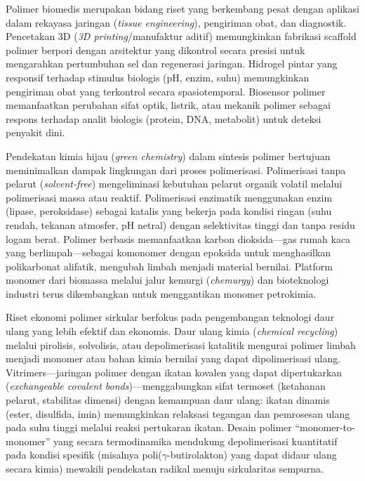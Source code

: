 \documentclass[12pt,a4paper,openany]{book}
\begin{document}
Polimer biomedis merupakan bidang riset yang berkembang pesat dengan aplikasi dalam rekayasa jaringan (\textit{tissue engineering}), pengiriman obat, dan diagnostik. Pencetakan 3D (\textit{3D printing}/manufaktur aditif) memungkinkan fabrikasi scaffold polimer berpori dengan arsitektur yang dikontrol secara presisi untuk mengarahkan pertumbuhan sel dan regenerasi jaringan. Hidrogel pintar yang responsif terhadap stimulus biologis (pH, enzim, suhu) memungkinkan pengiriman obat yang terkontrol secara spasiotemporal. Biosensor polimer memanfaatkan perubahan sifat optik, listrik, atau mekanik polimer sebagai respons terhadap analit biologis (protein, DNA, metabolit) untuk deteksi penyakit dini.

Pendekatan kimia hijau (\textit{green chemistry}) dalam sintesis polimer bertujuan meminimalkan dampak lingkungan dari proses polimerisasi. Polimerisasi tanpa pelarut (\textit{solvent-free}) mengeliminasi kebutuhan pelarut organik volatil melalui polimerisasi massa atau reaktif. Polimerisasi enzimatik menggunakan enzim (lipase, peroksidase) sebagai katalis yang bekerja pada kondisi ringan (suhu rendah, tekanan atmosfer, pH netral) dengan selektivitas tinggi dan tanpa residu logam berat. Polimer berbasis  memanfaatkan karbon dioksida---gas rumah kaca yang berlimpah---sebagai komonomer dengan epoksida untuk menghasilkan polikarbonat alifatik, mengubah limbah menjadi material bernilai. Platform monomer dari biomassa melalui jalur kemurgi (\textit{chemurgy}) dan bioteknologi industri terus dikembangkan untuk menggantikan monomer petrokimia.

Riset ekonomi polimer sirkular berfokus pada pengembangan teknologi daur ulang yang lebih efektif dan ekonomis. Daur ulang kimia (\textit{chemical recycling}) melalui pirolisis, solvolisis, atau depolimerisasi katalitik mengurai polimer limbah menjadi monomer atau bahan kimia bernilai yang dapat dipolimerisasi ulang. Vitrimers---jaringan polimer dengan ikatan kovalen yang dapat dipertukarkan (\textit{exchangeable covalent bonds})---menggabungkan sifat termoset (ketahanan pelarut, stabilitas dimensi) dengan kemampuan daur ulang: ikatan dinamis (ester, disulfida, imin) memungkinkan relaksasi tegangan dan pemrosesan ulang pada suhu tinggi melalui reaksi pertukaran ikatan. Desain polimer ``monomer-to-monomer'' yang secara termodinamika mendukung depolimerisasi kuantitatif pada kondisi spesifik (misalnya poli($\gamma$-butirolakton) yang dapat didaur ulang secara kimia) mewakili pendekatan radikal menuju sirkularitas sempurna.
\end{document}

